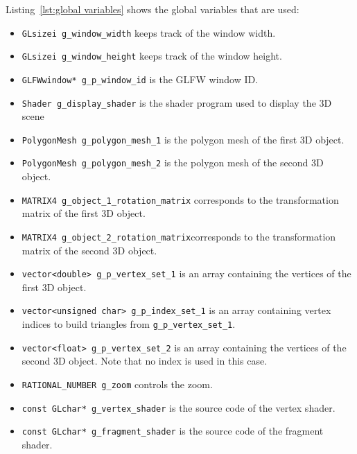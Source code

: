 \documentclass[11pt,oneside,a4paper,final]{article}
\begin{document}
Listing~\ref{lst:global variables} shows the global variables that are used:
\begin{itemize}
	\item \verb+GLsizei g_window_width+ keeps track of the window width.

	\item \verb+GLsizei g_window_height+ keeps track of the window height.
	
	\item \verb+GLFWwindow* g_p_window_id+ is the GLFW window ID.
	
	\item \verb+Shader g_display_shader+ is the shader program used to 
		display the 3D scene
	
	\item \verb+PolygonMesh g_polygon_mesh_1+ is the polygon mesh of the first 
		3D object.
	
	\item \verb+PolygonMesh g_polygon_mesh_2+ is the polygon mesh of the second 
		3D object.

	\item \verb+MATRIX4 g_object_1_rotation_matrix+ corresponds to the 
		transformation matrix of the first 3D object.
	
	\item \verb+MATRIX4 g_object_2_rotation_matrix+corresponds to the 
		transformation matrix of the second 3D object.

	\item \verb+vector<double> g_p_vertex_set_1+ is an array containing 
		the vertices of the first 3D object.
		
	\item \verb+vector<unsigned char> g_p_index_set_1+ is an array 
		containing vertex indices to build triangles from 
		\verb+g_p_vertex_set_1+.

	\item \verb+vector<float> g_p_vertex_set_2+ is an array containing 
		the vertices of the second 3D object. Note that no index is used in 
		this case.

	\item \verb+RATIONAL_NUMBER g_zoom+ controls the zoom.

	\item \verb+const GLchar* g_vertex_shader+ is the source code of the vertex 
		shader.

	\item \verb+const GLchar* g_fragment_shader+ is the source code of the 
		fragment shader.
\end{itemize}
\end{document}

